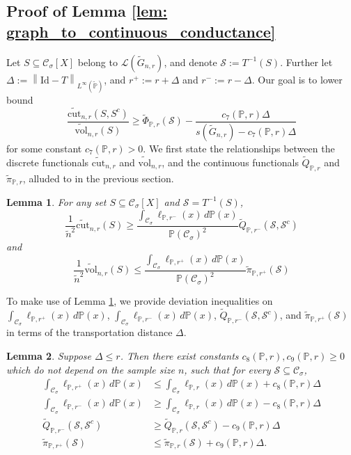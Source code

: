 \documentclass[11pt,twoside]{article}
\newtheorem{lemma}{Lemma}
\newcommand{\vol}{\mathrm{vol}}
\newcommand{\cut}{\mathrm{cut}}
\newcommand{\norm}[1]{\left\lVert#1\right\rVert}
\newcommand{\1}{\mathbf{1}}
\newcommand{\Xbf}{X}             %
\newcommand{\Pbb}{\mathbb{P}}
\newcommand{\Sset}{\mathcal{S}}
\newcommand{\Cset}{\mathcal{C}}
\newcommand{\Csig}{\Cset_{\sigma}}
\begin{document}
\subsection{Proof of Lemma \ref{lem: graph_to_continuous_conductance}}
Let $S \subseteq \Csig[\Xbf]$ belong to $\mathcal{L}(\widetilde{G}_{n,r})$, and denote $\Sset := T^{-1}(S)$. Further let $\varDelta := \norm{\mathrm{Id} - T}_{L^{\infty}(\widetilde{\Pbb})}$, and $r^{+} := r + \varDelta$ and $r^{-} := r - \varDelta$. Our goal is to lower bound
\begin{equation*}
\frac{\widetilde{\cut}_{n,r}(S,S^c)}{\widetilde{\vol}_{n,r}(S)} \geq \widetilde{\Phi}_{\Pbb,r}(\Sset) - \frac{c_7(\Pbb,r)\varDelta}{s(\widetilde{G}_{n,r}) - c_7(\Pbb,r) \varDelta}
\end{equation*}
for some constant $c_7(\Pbb,r) > 0$. We first state the relationships between the discrete functionals $\widetilde{\cut}_{n,r}$ and $\widetilde{\vol}_{n,r}$, and the continuous functionals $\widetilde{Q}_{\Pbb,r}$ and $\widetilde{\pi}_{\Pbb,r}$, alluded to in the previous section.
\begin{lemma}
	\label{lem: cut_volume}
	For any set $S \subseteq \Csig[\Xbf]$ and $\mathcal{S} = T^{-1}(S)$, 
	\begin{equation}
	\label{eqn: cut}
	\frac{1}{\widetilde{n}^2}\widetilde{\cut}_{n,r}(S) \geq \frac{\int_{\Csig} \ell_{\Pbb,r^-}(x) \,d\Pbb(x)}{\Pbb(\Csig)^2} \widetilde{Q}_{\Pbb,r^-}(\Sset, \Sset^c)
	\end{equation}
	and 
	\begin{equation}
	\label{eqn: volume}
	\frac{1}{\widetilde{n}^2}\widetilde{\vol}_{n,r}(S) \leq \frac{\int_{\Csig} \ell_{\Pbb,r^+}(x) \,d\Pbb(x)}{\Pbb(\Csig)^2} \widetilde{\pi}_{\Pbb,r^+}(\Sset)
	\end{equation}
\end{lemma}
To make use of Lemma \ref{lem: cut_volume}, we provide deviation inequalities on $\int_{\Csig} \ell_{\Pbb,r^+}(x) \,d\Pbb(x)$, $\int_{\Csig} \ell_{\Pbb,r^-}(x) \,d\Pbb(x)$, $\widetilde{Q}_{\Pbb,r^-}(\Sset, \Sset^c)$, and $\widetilde{\pi}_{\Pbb,r^+}(\Sset)$ in terms of the transportation distance $\varDelta$.
\begin{lemma}
	\label{lem: deviation_transportation_distance}
	Suppose $\Delta \leq r$. Then there exist constants $c_8(\Pbb,r),c_9(\Pbb,r) \geq 0$ which do not depend on the sample size $n$, such that for every $\Sset \subseteq \Csig$,
	\begin{align*}
	\int_{\Csig} \ell_{\Pbb,r^+}(x) \,d\Pbb(x) & \leq \int_{\Csig} \ell_{\Pbb,r}(x) \,d\Pbb(x) + c_8(\Pbb,r) \varDelta \\
	\int_{\Csig} \ell_{\Pbb,r^-}(x) \,d\Pbb(x) & \geq \int_{\Csig} \ell_{\Pbb,r}(x) \,d\Pbb(x) - c_8(\Pbb,r) \varDelta \\
	\widetilde{Q}_{\Pbb,r^-}(\Sset, \Sset^c) & \geq \widetilde{Q}_{\Pbb,r}(\Sset, \Sset^c) - c_9(\Pbb,r) \varDelta \\
	\widetilde{\pi}_{\Pbb,r^+}(\Sset) & \leq \widetilde{\pi}_{\Pbb,r}(\Sset) + c_9(\Pbb,r) \varDelta.
	\end{align*}
\end{lemma}
\end{document}
